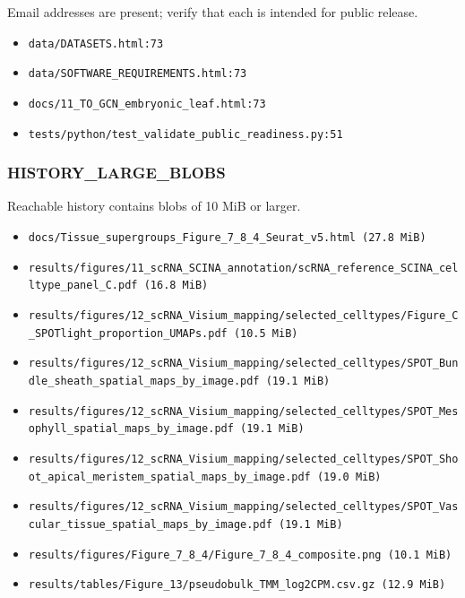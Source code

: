 \documentclass[
]{article}
\providecommand{\tightlist}{%
  \setlength{\itemsep}{0pt}\setlength{\parskip}{0pt}}
\begin{document}
Email addresses are present; verify that each is intended for public
release.

\begin{itemize}
\tightlist
\item
  \texttt{data/DATASETS.html:73}
\item
  \texttt{data/SOFTWARE\_REQUIREMENTS.html:73}
\item
  \texttt{docs/11\_TO\_GCN\_embryonic\_leaf.html:73}
\item
  \texttt{tests/python/test\_validate\_public\_readiness.py:51}
\end{itemize}

\subsubsection{HISTORY\_LARGE\_BLOBS}\label{history_large_blobs}

Reachable history contains blobs of 10 MiB or larger.

\begin{itemize}
\tightlist
\item
  \texttt{docs/Tissue\_supergroups\_Figure\_7\_8\_4\_Seurat\_v5.html\ (27.8\ MiB)}
\item
  \texttt{results/figures/11\_scRNA\_SCINA\_annotation/scRNA\_reference\_SCINA\_celltype\_panel\_C.pdf\ (16.8\ MiB)}
\item
  \texttt{results/figures/12\_scRNA\_Visium\_mapping/selected\_celltypes/Figure\_C\_SPOTlight\_proportion\_UMAPs.pdf\ (10.5\ MiB)}
\item
  \texttt{results/figures/12\_scRNA\_Visium\_mapping/selected\_celltypes/SPOT\_Bundle\_sheath\_spatial\_maps\_by\_image.pdf\ (19.1\ MiB)}
\item
  \texttt{results/figures/12\_scRNA\_Visium\_mapping/selected\_celltypes/SPOT\_Mesophyll\_spatial\_maps\_by\_image.pdf\ (19.1\ MiB)}
\item
  \texttt{results/figures/12\_scRNA\_Visium\_mapping/selected\_celltypes/SPOT\_Shoot\_apical\_meristem\_spatial\_maps\_by\_image.pdf\ (19.0\ MiB)}
\item
  \texttt{results/figures/12\_scRNA\_Visium\_mapping/selected\_celltypes/SPOT\_Vascular\_tissue\_spatial\_maps\_by\_image.pdf\ (19.1\ MiB)}
\item
  \texttt{results/figures/Figure\_7\_8\_4/Figure\_7\_8\_4\_composite.png\ (10.1\ MiB)}
\item
  \texttt{results/tables/Figure\_13/pseudobulk\_TMM\_log2CPM.csv.gz\ (12.9\ MiB)}
\end{itemize}
\end{document}

